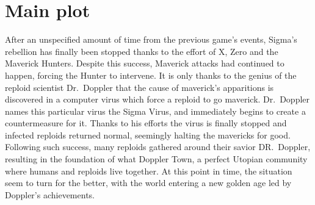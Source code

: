 \section{Main plot}
After an unspecified amount of time from the previous game's events, Sigma's rebellion has finally been stopped thanks to the effort of X, Zero and the Maverick Hunters. Despite this success, Maverick attacks had continued to happen, forcing the Hunter to intervene. It is only thanks to the genius of the reploid scientist Dr.~Doppler that the cause of maverick's apparitions is discovered in a computer virus which force a reploid to go maverick. Dr.~Doppler names this particular virus the Sigma Virus, and immediately begins to create a countermeasure for it. Thanks to his efforts the virus is  finally  stopped and infected reploids returned normal, seemingly halting the mavericks for good.  Following such success, many reploids gathered around their savior DR.~Doppler, resulting in the foundation of what Doppler Town, a perfect Utopian community where humans and reploids live together. At this point in time, the situation seem to turn for the better, with the world entering a new golden age led by Doppler's achievements.

